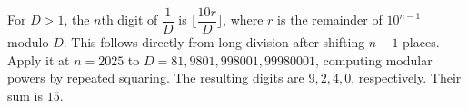 For $D>1$, the $n$th digit of $\dfrac{1}{D}$ is $\lfloor\dfrac{10r}{D}\rfloor$, where $r$ is the remainder of $10^{n-1}$ modulo $D$. This follows directly from long division after shifting $n-1$ places. Apply it at $n=2025$ to $D=81,9801,998001,99980001$, computing modular powers by repeated squaring. The resulting digits are $9,2,4,0$, respectively. Their sum is $\boxed{15}$.
